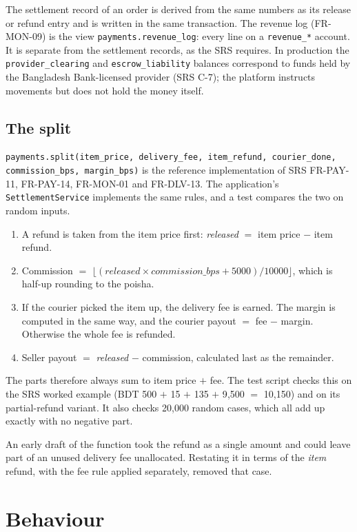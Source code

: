 \documentclass[11pt,a4paper]{article}
\begin{document}
The settlement record of an order is derived from the same numbers as its release or refund entry and is written in the same transaction. The revenue log (FR-MON-09) is the view \texttt{payments.revenue\_log}: every line on a \texttt{revenue\_*} account. It is separate from the settlement records, as the SRS requires. In production the \texttt{provider\_clearing} and \texttt{escrow\_liability} balances correspond to funds held by the Bangladesh Bank-licensed provider (SRS C-7); the platform instructs movements but does not hold the money itself.

\subsection{The split}
\label{sec:split}
\texttt{payments.split(item\_price, delivery\_fee, item\_refund, courier\_done, commission\_bps, margin\_bps)} is the reference implementation of SRS FR-PAY-11, FR-PAY-14, FR-MON-01 and FR-DLV-13. The application's \texttt{SettlementService} implements the same rules, and a test compares the two on random inputs.
\begin{enumerate}[nosep]
  \item A refund is taken from the item price first: \textit{released} $=$ item price $-$ item refund.
  \item Commission $=$ $\lfloor(\textit{released} \times \textit{commission\_bps} + 5000)/10000\rfloor$, which is half-up rounding to the poisha.
  \item If the courier picked the item up, the delivery fee is earned. The margin is computed in the same way, and the courier payout $=$ fee $-$ margin. Otherwise the whole fee is refunded.
  \item Seller payout $=$ \textit{released} $-$ commission, calculated last as the remainder.
\end{enumerate}
The parts therefore always sum to item price $+$ fee. The test script checks this on the SRS worked example (BDT 500 $+$ 15 $+$ 135 $+$ 9{,}500 $=$ 10{,}150) and on its partial-refund variant. It also checks 20{,}000 random cases, which all add up exactly with no negative part.

An early draft of the function took the refund as a single amount and could leave part of an unused delivery fee unallocated. Restating it in terms of the \emph{item} refund, with the fee rule applied separately, removed that case.
\section{Behaviour}
\end{document}
